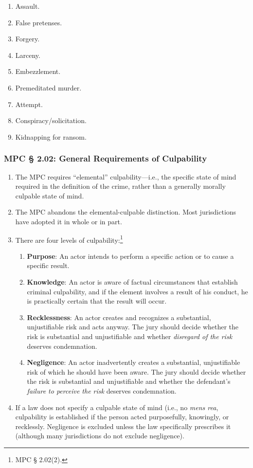 \begin{enumerate}
\begin{enumerate}
        \item Assault. 
        \item False pretenses.
        \item Forgery.
        \item Larceny.
        \item Embezzlement.
        \item Premeditated murder.
        \item Attempt.
        \item Conspiracy/solicitation.
        \item Kidnapping for ransom.
    \end{enumerate}
\end{enumerate}

\subsubsection{MPC § 2.02: General Requirements of Culpability}

\begin{enumerate}
    \item The MPC requires ``elemental'' culpability---i.e., the specific state of mind required in the definition of the crime, rather than a generally morally culpable state of mind.
    \item The MPC abandons the elemental-culpable distinction. Most jurisdictions have adopted it in whole or in part.
    \item There are four levels of culpability:\footnote{MPC § 2.02(2).}
    \begin{enumerate}
        \item \textbf{Purpose}: An actor intends to perform a specific action or to cause a specific result.
        \item \textbf{Knowledge}: An actor is aware of factual circumstances that establish criminal culpability, and if the element involves a result of his conduct, he is practically certain that the result will occur. 
        \item \textbf{Recklessness}: An actor creates and recognizes a substantial, unjustifiable risk and acts anyway. The jury should decide whether the risk is substantial and unjustifiable and whether \emph{disregard of the risk} deserves condemnation. 
        \item \textbf{Negligence}: An actor inadvertently creates a substantial, unjustifiable risk of which he should have been aware. The jury should decide whether the risk is substantial and unjustifiable and whether the defendant's \emph{failure to perceive the risk} deserves condemnation.
    \end{enumerate}
    \item If a law does not specify a culpable state of mind (i.e., no \emph{mens rea}, culpability is established if the person acted purposefully, knowingly, or recklessly. Negligence is excluded unless the law specifically prescribes it (although many jurisdictions do not exclude negligence).
\end{enumerate}

